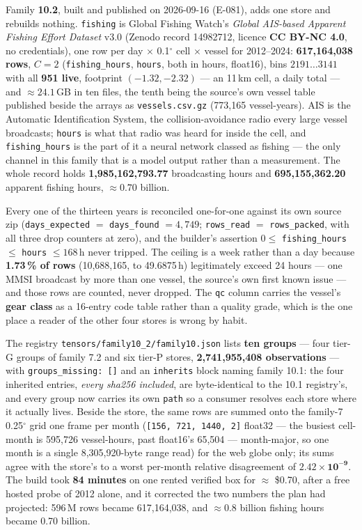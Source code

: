 \documentclass[10pt]{article}
\newcommand{\code}[1]{\texttt{#1}}
\begin{document}
Family \textbf{10.2}, built and published on 2026-09-16 (E-081), adds one store
and rebuilds nothing. \code{fishing} is Global Fishing Watch's
\emph{Global AIS-based Apparent Fishing Effort Dataset} v3.0 (Zenodo record
14982712, licence \textbf{CC BY-NC 4.0}, no credentials), one row per day
$\times$ 0.1$^\circ$ cell $\times$ vessel for 2012--2024: \textbf{617,164,038
rows}, $C = 2$ (\code{fishing\_hours}, \code{hours}, both in hours, float16),
bins $2191\ldots3141$ with all \textbf{951 live}, footprint $(-1.32, -2.32)$ ---
an 11\,km cell, a daily total --- and $\approx 24.1$\,GB in ten files, the tenth
being the source's own vessel table published beside the arrays as
\code{vessels.csv.gz} (773,165 vessel-years). AIS is the Automatic
Identification System, the collision-avoidance radio every large vessel
broadcasts; \code{hours} is what that radio was heard for inside the cell, and
\code{fishing\_hours} is the part of it a neural network classed as fishing ---
the only channel in this family that is a model output rather than a
measurement. The whole record holds \textbf{1,985,162,793.77} broadcasting
hours and \textbf{695,155,362.20} apparent fishing hours, $\approx 0.70$
billion.

Every one of the thirteen years is reconciled one-for-one against its own
source zip (\code{days\_expected} $=$ \code{days\_found} $= 4{,}749$;
\code{rows\_read} $=$ \code{rows\_packed}, with all three drop counters at
zero), and the builder's assertion $0 \le$ \code{fishing\_hours} $\le$
\code{hours} $\le 168$\,h never tripped. The ceiling is a week rather than a
day because \textbf{1.73\,\% of rows} (10,688,165, to 49.6875\,h) legitimately
exceed 24 hours --- one MMSI broadcast by more than one vessel, the source's own
first known issue --- and those rows are counted, never dropped. The
\code{qc} column carries the vessel's \textbf{gear class} as a 16-entry code
table rather than a quality grade, which is the one place a reader of the other
four stores is wrong by habit.

The registry \code{tensors/family10\_2/family10.json} lists \textbf{ten groups}
--- four tier-G groups of family 7.2 and six tier-P stores, \textbf{2,741,955,408
observations} --- with \code{groups\_missing: []} and an \code{inherits} block
naming family 10.1: the four inherited entries, \emph{every sha256 included},
are byte-identical to the 10.1 registry's, and every group now carries its own
\code{path} so a consumer resolves each store where it actually lives. Beside
the store, the same rows are summed onto the family-7 0.25$^\circ$ grid one
frame per month (\code{[156, 721, 1440, 2]} float32 --- the busiest cell-month
is 595,726 vessel-hours, past float16's 65,504 --- month-major, so one month is
a single 8,305,920-byte range read) for the web globe only; its sums agree with
the store's to a worst per-month relative disagreement of
$\mathbf{2.42\times10^{-9}}$. The build took \textbf{84 minutes} on one rented
verified box for $\approx$ \$0.70, after a free hosted probe of 2012 alone, and
it corrected the two numbers the plan had projected: 596\,M rows became
617,164,038, and $\approx 0.8$ billion fishing hours became 0.70 billion.
\end{document}
